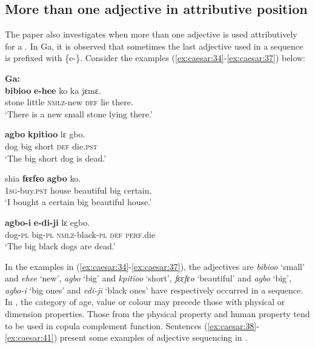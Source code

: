 \documentclass[output=paper,
modfonts
]{langscibook}
\begin{document}
\subsection{More than one adjective in attributive position}\label{sec:caesar:4.2} 

The paper also investigates when more than one adjective is used attributively for a . In Ga, it is observed that sometimes the last adjective used in a sequence is prefixed with \{e-\}. Consider the  examples (\ref{ex:caesar:34}-\ref{ex:caesar:37}) below:
\newline

\ea\label{ex:caesar:34}
\textbf{Ga:}\\
 \textbf{{bibioo}}{}  \textbf{{e-hee}} {ko} {ka} {jɛmɛ.}\\
 stone little \textsc{nmlz-}new \textsc{def} lie there.\\
\glt ‘There is a new small stone lying there.’
\z



\ea\label{ex:caesar:35}
 \textbf{agbo} \textbf{kpitioo} {lɛ} {gbo.}\\
 dog big short \textsc{def} die.\textsc{pst}\\
\glt ‘The big short dog is dead.’
\z


\ea\label{ex:caesar:36}
 {shia} \textbf{fɛɛfɛo} \textbf{agbo} {ko.}\\
 1\textsc{sg-}buy.\textsc{pst} house beautiful big certain.\\
\glt ‘I bought a certain big beautiful house.’
\z



\ea\label{ex:caesar:37}
 \textbf{{agbo-i}} \textbf{e-di-ji} {lɛ} {egbo.}\\
 dog-\textsc{pl} big-\textsc{pl} \textsc{nmlz-}black-\textsc{pl} \textsc{def} \textsc{perf}.die\\
\glt  ‘The big black dogs are dead.’
\z

In the  examples in (\ref{ex:caesar:34}-\ref{ex:caesar:37}), the adjectives are \textit{bibioo} ‘small’ and \textit{ehee} ‘new’, \textit{agbo} ‘big’ and \textit{kpitioo} ‘short’, \textit{fɛɛfɛo} ‘beautiful’ and \textit{agbo} ‘big’, \textit{agbo-i} ‘big ones’ and \textit{edi-ji} ‘black ones’ have respectively occurred in a sequence. In , the category of age, value or colour may precede those with physical or dimension properties. Those from the physical property and human property tend to be used in copula complement function. Sentences (\ref{ex:caesar:38}-\ref{ex:caesar:41}) present some examples of adjective sequencing in .
\end{document}
